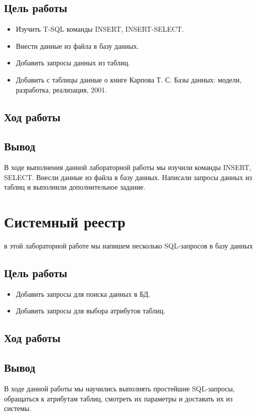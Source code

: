 \subsection{Цель работы}
\begin{itemize}
    \item Изучить T-SQL команды INSERT, INSERT-SELECT.
    \item Внести данные из файла в базу данных.
    \item Добавить запросы данных из таблиц.
    \item Добавить с таблицы данные о книге Карпова Т. С. Базы данных: модели, разработка, реализация, 2001.
\end{itemize}
\subsection{Ход работы}

\subsection{Вывод}
В ходе выполнения данной лабораторной работы мы изучили команды INSERT, SELECT. Внесли данные из файла в базу данных. Написали запросы данных из таблиц и выполнили дополнительное задание. 

\section{Системный реестр}
в этой лабораторной работе мы напишем несколько SQL-запросов в базу данных

\subsection{Цель работы}
\begin{itemize}
    \item Добавить запросы для поиска данных в БД.
    \item Добавить запросы для выбора атрибутов таблиц.
\end{itemize}
\subsection{Ход работы}
\subsection{Вывод}
В ходе данной работы мы научились выполнять простейшие SQL-запросы, обращаться к атрибутам таблиц, смотреть их параметры и доставать их из системы.
\newpage


